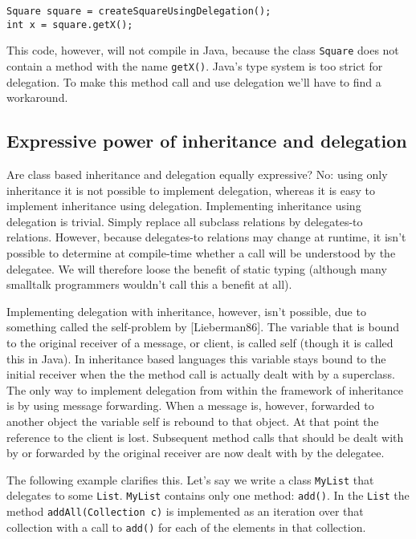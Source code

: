 \documentclass[a4paper,12pt]{book}
\begin{document}
\begin{verbatim}
Square square = createSquareUsingDelegation();
int x = square.getX();
\end{verbatim}

This code, however, will not compile in Java, because the class \verb|Square| does not contain a method with the name \verb|getX()|. Java's type system is too strict for delegation. To make this method call and use delegation we'll have to find a workaround.

\subsection*{Expressive power of inheritance and delegation}
Are class based inheritance and delegation equally expressive? No: using only inheritance it is not possible to implement delegation, whereas it is easy to implement inheritance using delegation. Implementing inheritance using delegation is trivial. Simply replace all subclass relations by delegates-to relations. However, because delegates-to relations may change at runtime, it isn't possible to determine at compile-time whether a call will be understood by the delegatee. We will therefore loose the benefit of static typing (although many smalltalk programmers wouldn't call this a benefit at all).

Implementing delegation with inheritance, however, isn't possible, due to something called the self-problem by [Lieberman86]. The variable that is bound to the original receiver of a message, or client, is called self (though it is called this in Java). In inheritance based languages this variable stays bound to the initial receiver when the the method call is actually dealt with by a superclass. The only way to implement delegation from within the framework of inheritance is by using message forwarding. When a message is, however, forwarded to another object the variable self is rebound to that object. At that point the reference to the client is lost. Subsequent method calls that should be dealt with by or forwarded by the original receiver are now dealt with by the delegatee.

The following example clarifies this. Let's say we write a class \verb|MyList| that delegates to some \verb|List|. \verb|MyList| contains only one method: \verb|add()|. In the \verb|List| the method \verb|addAll(Collection c)| is implemented as an iteration over that collection with a call to \verb|add()| for each of the elements in that collection.
\end{document}
